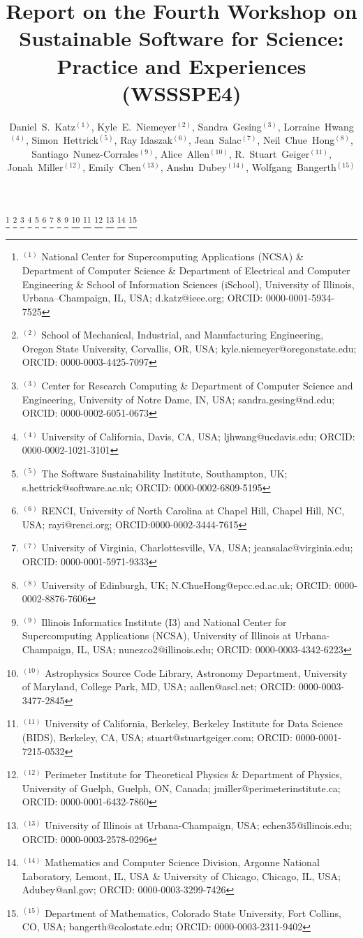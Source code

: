 \documentclass[11pt, oneside]{amsart}
\begin{document}
\title[]{Report on the Fourth Workshop on Sustainable Software for Science: Practice and Experiences (WSSSPE4)}

\author{Daniel~S.~Katz$^{(1)}$,
Kyle~E.~Niemeyer$^{(2)}$,
Sandra~Gesing$^{(3)}$,
Lorraine~Hwang$^{(4)}$,
Simon~Hettrick$^{(5)}$,
Ray Idaszak$^{(6)}$,
Jean~Salac$^{(7)}$,
Neil~Chue~Hong$^{(8)}$,
Santiago~Nunez-Corrales$^{(9)}$,
Alice~Allen$^{(10)}$,
R.~Stuart~Geiger$^{(11)}$,
Jonah~Miller$^{(12)}$,
Emily~Chen$^{(13)}$,
Anshu~Dubey$^{(14)}$,
Wolfgang~Bangerth$^{(15)}$%
}

%
\thanks{{}$^{(1)}$ National Center for Supercomputing Applications (NCSA) \&
Department of Computer Science  \&
Department of Electrical and Computer Engineering  \&
School of Information Sciences (iSchool),
University of Illinois, Urbana--Champaign, IL, USA; d.katz@ieee.org; ORCID: 0000-0001-5934-7525}
%
\thanks{{}$^{(2)}$ School of Mechanical, Industrial, and Manufacturing Engineering,
Oregon State University, Corvallis, OR, USA; kyle.niemeyer@oregonstate.edu; ORCID: 0000-0003-4425-7097}
%
\thanks{{}$^{(3)}$ Center for Research Computing \& Department of Computer Science and Engineering,
University of Notre Dame, IN, USA; sandra.gesing@nd.edu; ORCID: 0000-0002-6051-0673}
%
\thanks{{}$^{(4)}$ University of California, Davis, CA, USA; ljhwang@ucdavis.edu; ORCID: 0000-0002-1021-3101}
%
\thanks{{}$^{(5)}$ The Software Sustainability Institute, Southampton, UK; s.hettrick@software.ac.uk; ORCID: 0000-0002-6809-5195}
%
\thanks{{}$^{(6)}$ RENCI, University of North Carolina at Chapel Hill, Chapel Hill, NC, USA; rayi@renci.org; ORCID:0000-0002-3444-7615}
%
\thanks{{}$^{(7)}$ University of Virginia, Charlottesville, VA, USA; jeansalac@virginia.edu; ORCID: 0000-0001-5971-9333}
%
\thanks{{}$^{(8)}$ University of Edinburgh, UK; N.ChueHong@epcc.ed.ac.uk;
ORCID: 0000-0002-8876-7606}
%
\thanks{{}$^{(9)}$ Illinois Informatics Institute (I3) and National Center for Supercomputing Applications (NCSA), University of Illinois at Urbana-Champaign, IL, USA;
nunezco2@illinois.edu;
ORCID: 0000-0003-4342-6223}
%
\thanks{{}$^{(10)}$ Astrophysics Source Code Library, Astronomy Department, University of Maryland, College Park, MD, USA; aallen@ascl.net; ORCID: 0000-0003-3477-2845}
%
\thanks{{}$^{(11)}$ University of California, Berkeley, Berkeley Institute for Data Science (BIDS), Berkeley, CA, USA; stuart@stuartgeiger.com; ORCID: 0000-0001-7215-0532}
%
\thanks{{}$^{(12)}$ Perimeter Institute for Theoretical Physics \&
Department of Physics, University of Guelph, 
Guelph, ON, Canada; 
jmiller@perimeterinstitute.ca; ORCID: 0000-0001-6432-7860}
%
\thanks{{}$^{(13)}$ University of Illinois at Urbana-Champaign, USA; echen35@illinois.edu; ORCID: 0000-0003-2578-0296}
%
\thanks{{}$^{(14)}$ Mathematics and Computer Science Division,
Argonne National Laboratory,
Lemont, IL, USA \& 
University of Chicago, 
Chicago, IL, USA;
Adubey@anl.gov;
ORCID: 0000-0003-3299-7426}
%
\thanks{{}$^{(15)}$ Department of Mathematics, Colorado State
  University, Fort Collins, CO, USA; bangerth@colostate.edu; ORCID: 0000-0003-2311-9402}
\end{document}
